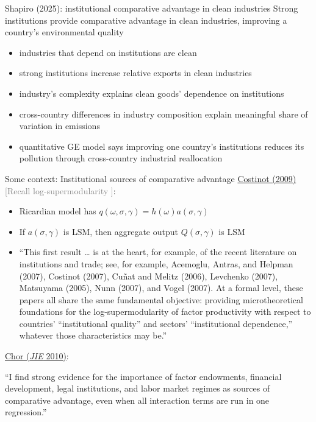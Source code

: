 \documentclass[11pt,notes=hide,aspectratio=169]{beamer}
\begin{document}
\begin{frame}{Shapiro (2025): institutional comparative advantage in clean industries}
Strong institutions provide comparative advantage in clean industries, improving a country's environmental quality
\begin{itemize}
\item industries that depend on institutions are clean
\item strong institutions increase relative exports in clean industries
\item industry's complexity explains clean goods' dependence on institutions
\item cross-country differences in industry composition explain meaningful share of variation in emissions
\item quantitative GE model says improving one country's  institutions reduces its pollution through cross-country industrial reallocation
\end{itemize}
\end{frame}
\begin{frame}{Some context: Institutional sources of comparative advantage}
\hypertarget{institutionalsourcesofCA}{}
\href{http://dx.doi.org/10.3982/ECTA7636}{Costinot (2009)} \textcolor{gray}{[Recall log-supermodularity \hyperlink{appendix:LSM}{}]}:
\begin{itemize}
\item Ricardian model has $q(\omega,\sigma,\gamma) = h(\omega) a(\sigma,\gamma)$ 
\item If $a(\sigma,\gamma)$ is LSM, then aggregate output $Q(\sigma,\gamma)$ is LSM
\item {\footnotesize
``This first result %
\dots
is at the heart, for example, of the recent literature on institutions and trade; see, for example, Acemoglu, Antras, and Helpman (2007), Costinot (2007), Cuñat and Melitz (2006), Levchenko (2007), Matsuyama (2005), Nunn (2007), and Vogel (2007). At a formal level, these papers all share the same fundamental objective: providing microtheoretical foundations for the log-supermodularity of factor productivity with respect to countries’ ``institutional quality'' and sectors’ ``institutional dependence,'' whatever those characteristics may be.''\par}
\end{itemize}
\href{http://dx.doi.org/10.1016/j.jinteco.2010.07.004}{Chor (\textit{JIE} 2010)}:
{\small ``I find strong evidence for the importance of factor endowments, financial development, legal institutions, and labor market regimes as sources of comparative advantage, even when all interaction terms are run in one regression.''\par}
\end{frame}
\end{document}
